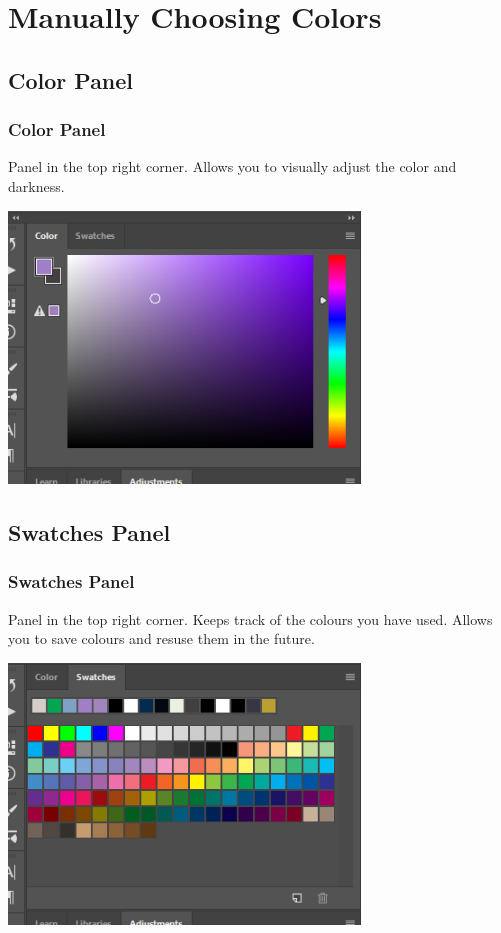 \documentclass{beamer}
\begin{document}
		\section{Manually Choosing Colors}
		\subsection{Color Panel}		
		\begin{frame}
			\frametitle{Color Panel}
			\begin{outline}
				\1 Panel in the top right corner.
				\1 Allows you to visually adjust the color and darkness.
			\end{outline}
			\includegraphics[width=0.7\textwidth]{images/color panel.png}
		\end{frame}
	
\subsection{Swatches Panel}		
\begin{frame}
	\frametitle{Swatches Panel}
	\begin{outline}
		\1 Panel in the top right corner.
		\1 Keeps track of the colours you have used.
		\1 Allows you to save colours and resuse them in the future.
	\end{outline}
	\includegraphics[width=0.7\textwidth]{images/swatches panel.png}
\end{frame}
\end{document}
